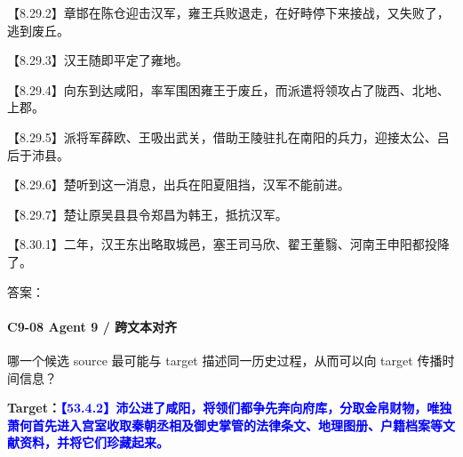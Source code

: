 \documentclass[fontset=none,11pt,a4paper]{ctexart}
\newcommand{\answerline}[1]{\underline{\hspace{#1}}}
\begin{document}
\begin{enumerate}[label=\Alph*.]
\noindent 【8.29.2】章邯在陈仓迎击汉军，雍王兵败退走，在好畤停下来接战，又失败了，逃到废丘。\par
\noindent 【8.29.3】汉王随即平定了雍地。\par
\noindent 【8.29.4】向东到达咸阳，率军围困雍王于废丘，而派遣将领攻占了陇西、北地、上郡。\par
\noindent 【8.29.5】派将军薛欧、王吸出武关，借助王陵驻扎在南阳的兵力，迎接太公、吕后于沛县。\par
\noindent 【8.29.6】楚听到这一消息，出兵在阳夏阻挡，汉军不能前进。\par
\noindent 【8.29.7】楚让原吴县县令郑昌为韩王，抵抗汉军。\par
\noindent 【8.30.1】二年，汉王东出略取城邑，塞王司马欣、翟王董翳、河南王申阳都投降了。\par
\end{enumerate}
答案：\answerline{2.2cm}

\paragraph{C9-08 \quad Agent 9 / 跨文本对齐}
哪一个候选 source 最可能与 target 描述同一历史过程，从而可以向 target 传播时间信息？

\textbf{Target：}\textcolor{blue}{\textbf{【53.4.2】沛公进了咸阳，将领们都争先奔向府库，分取金帛财物，唯独萧何首先进入宫室收取秦朝丞相及御史掌管的法律条文、地理图册、户籍档案等文献资料，并将它们珍藏起来。}}
\end{document}
